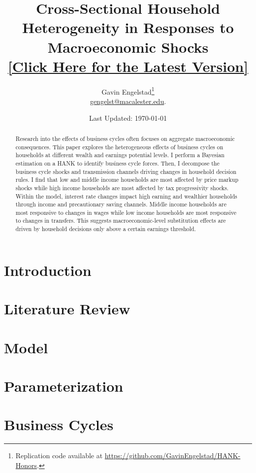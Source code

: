 \documentclass[11pt]{article}
\title{Cross-Sectional Household Heterogeneity in Responses to Macroeconomic Shocks \\ {\large \href{https://gavinengelstad.github.io/assets/pdf/hank/paper.pdf}{[Click Here for the Latest Version]}}}
\author{Gavin Engelstad\thanks{Replication code available at \url{https://github.com/GavinEngelstad/HANK-Honors}.} \\ \href{mailto:gengelst@macalester.edu}{gengelst@macalester.edu}.}
\date{Last Updated: \today}
\numberwithin{equation}{section} %
\numberwithin{figure}{section} %
\numberwithin{table}{section} %
\begin{document}
\maketitle

\begin{abstract}
  Research into the effects of business cycles often focuses on aggregate macroeconomic consequences. This paper explores the heterogeneous effects of business cycles on households at different wealth and earnings potential levels. I perform a Bayesian estimation on a HANK to identify business cycle forces. Then, I decompose the business cycle shocks and transmission channels driving changes in household decision rules. I find that low and middle income households are most affected by price markup shocks while high income households are most affected by tax progressivity shocks. Within the model, interest rate changes impact high earning and wealthier households through income and precautionary saving channels. Middle income households are most responsive to changes in wages while low income households are most responsive to changes in transfers. This suggests macroeconomic-level substitution effects are driven by household decisions only above a certain earnings threshold. 
\end{abstract}


\section{Introduction} \label{sec:intro}


\section{Literature Review} \label{sec:lit-review}


\section{Model}
 \label{sec:model}

\section{Parameterization} \label{sec:params}


\section{Business Cycles} \label{sec:buis-cycs}

\end{document}
